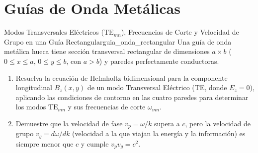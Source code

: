 \documentclass[11pt,a4paper]{book}
\begin{document}
\section{Guías de Onda Metálicas}

\begin{ejercicio}{Modos Transversales Eléctricos ($\text{TE}_{mn}$), Frecuencias de Corte y Velocidad de Grupo en una Guía Rectangular}{guia_onda_rectangular}
Una guía de onda metálica hueca tiene sección transversal rectangular de dimensiones $a \times b$ ($0 \le x \le a$, $0 \le y \le b$, con $a > b$) y paredes perfectamente conductoras.
\begin{enumerate}[label=\alph*)]
    \item Resuelva la ecuación de Helmholtz bidimensional para la componente longitudinal $B_z(x,y)$ de un modo Transversal Eléctrico (TE, donde $E_z = 0$), aplicando las condiciones de contorno en las cuatro paredes para determinar los modos $\text{TE}_{mn}$ y sus frecuencias de corte $\omega_{mn}$.
    \item Demuestre que la velocidad de fase $v_p = \omega/k$ supera a $c$, pero la velocidad de grupo $v_g = d\omega/dk$ (velocidad a la que viajan la energía y la información) es siempre menor que $c$ y cumple $v_p v_g = c^2$.
\end{enumerate}
\end{ejercicio}
\end{document}
